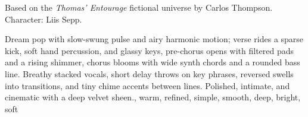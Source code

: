

\begin{notes}
Based on the \emph{Thomas’ Entourage} fictional universe by Carlos Thompson.\\
Character: Liis Sepp.\\
\end{notes}

\begin{style}
Dream pop with slow-swung pulse and airy harmonic motion; verse rides a sparse kick, soft hand percussion, and glassy keys, pre-chorus opens with filtered pads and a rising shimmer, chorus blooms with wide synth chords and a rounded bass line. %
Breathy stacked vocals, short delay throws on key phrases, reversed swells into transitions, and tiny chime accents between lines. %
Polished, intimate, and cinematic with a deep velvet sheen., warm, refined, simple, smooth, deep, bright, soft
\end{style}

